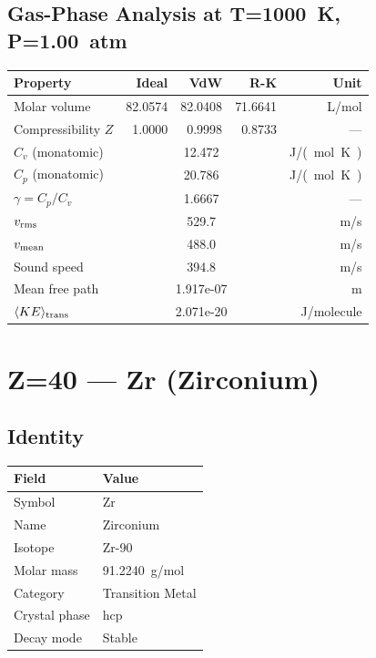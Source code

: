 \documentclass[11pt,a4paper]{article}
\begin{document}
\subsection{Gas-Phase Analysis at T=\SI{1000}{K}, P=\SI{1.00}{atm}}
\begin{tabular}{lrrrr}
  \toprule
  Property & Ideal & VdW & R-K & Unit \\
  \midrule
  Molar volume & 82.0574 & 82.0408 & 71.6641 & \si{L/mol} \\
  Compressibility $Z$ & 1.0000 & 0.9998 & 0.8733 & --- \\
  \midrule
  $C_v$ (monatomic) & \multicolumn{3}{c}{12.472} & \si{J/(mol.K)} \\
  $C_p$ (monatomic) & \multicolumn{3}{c}{20.786} & \si{J/(mol.K)} \\
  $\gamma = C_p/C_v$ & \multicolumn{3}{c}{1.6667} & --- \\
  $v_{\rm rms}$ & \multicolumn{3}{c}{529.7} & \si{m/s} \\
  $v_{\rm mean}$ & \multicolumn{3}{c}{488.0} & \si{m/s} \\
  Sound speed & \multicolumn{3}{c}{394.8} & \si{m/s} \\
  Mean free path & \multicolumn{3}{c}{1.917e-07} & \si{m} \\
  $\langle KE \rangle_{\rm trans}$ & \multicolumn{3}{c}{2.071e-20} & \si{J/molecule} \\
  \bottomrule
\end{tabular}

\newpage

\section{Z=40 --- Zr (Zirconium)}
\label{sec:Z40}

\subsection{Identity}
\begin{tabular}{ll}
  \toprule
  Field & Value \\
  \midrule
  Symbol & Zr \\
  Name & Zirconium \\
  Isotope & Zr-90 \\
  Molar mass & \SI{91.2240}{g/mol} \\
  Category & Transition Metal \\
  Crystal phase & hcp \\
  Decay mode & Stable \\
  \bottomrule
\end{tabular}
\end{document}
